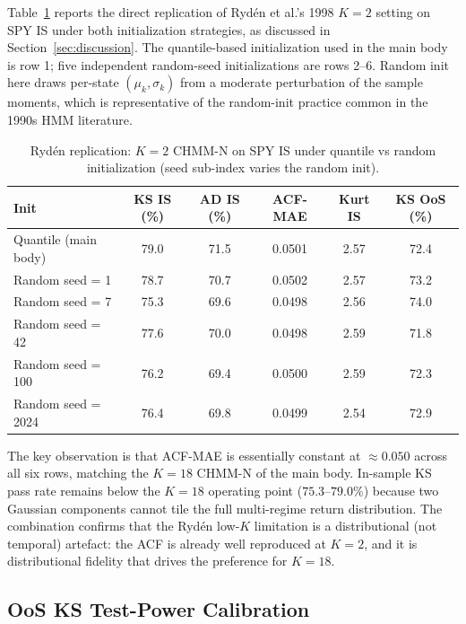 Table~\ref{tab:ryden_init} reports the direct replication of Ryd\'en et al.'s 1998 $K = 2$ setting on SPY IS under both initialization strategies, as discussed in Section~\ref{sec:discussion}.
The quantile-based initialization used in the main body is row 1; five independent random-seed initializations are rows 2--6.
Random init here draws per-state $(\mu_k, \sigma_k)$ from a moderate perturbation of the sample moments, which is representative of the random-init practice common in the 1990s HMM literature.

\begin{table}[h]
\centering
\small
\caption{Ryd\'en replication: $K = 2$ CHMM-N on SPY IS under quantile vs random initialization (seed sub-index varies the random init).}
\label{tab:ryden_init}
\begin{tabular}{l c c c c c}
\toprule
Init & KS IS (\%) & AD IS (\%) & ACF-MAE & Kurt IS & KS OoS (\%) \\
\midrule
Quantile (main body) & 79.0 & 71.5 & 0.0501 & 2.57 & 72.4 \\
Random seed = 1      & 78.7 & 70.7 & 0.0502 & 2.57 & 73.2 \\
Random seed = 7      & 75.3 & 69.6 & 0.0498 & 2.56 & 74.0 \\
Random seed = 42     & 77.6 & 70.0 & 0.0498 & 2.59 & 71.8 \\
Random seed = 100    & 76.2 & 69.4 & 0.0500 & 2.59 & 72.3 \\
Random seed = 2024   & 76.4 & 69.8 & 0.0499 & 2.54 & 72.9 \\
\bottomrule
\end{tabular}
\end{table}

The key observation is that ACF-MAE is essentially constant at $\approx 0.050$ across all six rows, matching the $K = 18$ CHMM-N of the main body.
In-sample KS pass rate remains below the $K = 18$ operating point ($75.3$--$79.0\%$) because two Gaussian components cannot tile the full multi-regime return distribution.
The combination confirms that the Ryd\'en low-$K$ limitation is a distributional (not temporal) artefact: the ACF is already well reproduced at $K = 2$, and it is distributional fidelity that drives the preference for $K = 18$.

\subsection{OoS KS Test-Power Calibration}
\label{sec:ks_power}

